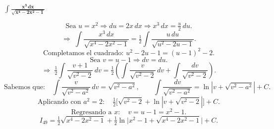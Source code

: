 $\displaystyle \mathbf{\int \frac{x^{3}\,dx}{\sqrt{x^{4}-2x^{2}-1}}}$

\nopagebreak
$$
\text{Sea } u = x^{2} \Rightarrow du = 2x\,dx \Rightarrow x^{3}\,dx = \tfrac{u}{2}\,du.
$$
$$
\Rightarrow\;
\int \frac{x^{3}\,dx}{\sqrt{x^{4}-2x^{2}-1}}
= \tfrac{1}{2}\int \frac{u\,du}{\sqrt{u^{2}-2u-1}}.
$$
$$
\text{Completamos el cuadrado: } u^{2}-2u-1 = (u-1)^{2} - 2.
$$
$$
\text{Sea } v = u - 1 \Rightarrow dv = du.
$$
$$
\Rightarrow\;
\tfrac{1}{2}\int \frac{v+1}{\sqrt{v^{2}-2}}\,dv
= \tfrac{1}{2}\left(\int \frac{v}{\sqrt{v^{2}-2}}\,dv + \int \frac{dv}{\sqrt{v^{2}-2}}\right).
$$
$$
\text{Sabemos que:}\quad
\int \frac{v}{\sqrt{v^{2}-a^{2}}}\,dv = \sqrt{v^{2}-a^{2}}, \qquad
\int \frac{dv}{\sqrt{v^{2}-a^{2}}} = \ln|v+\sqrt{v^{2}-a^{2}}| + C.
$$
$$
\text{Aplicando con } a^{2}=2:\quad
\tfrac{1}{2}\Big[\sqrt{v^{2}-2} + \ln|v+\sqrt{v^{2}-2}|\Big] + C.
$$
$$
\text{Regresando a } x:\quad v = u - 1 = x^{2} - 1.
$$
$$
\boxed{
I_{49} =
\tfrac{1}{2}\sqrt{x^{4}-2x^{2}-1}
+ \tfrac{1}{2}\ln\!\Big|x^{2}-1+\sqrt{x^{4}-2x^{2}-1}\Big| + C.
}
$$
